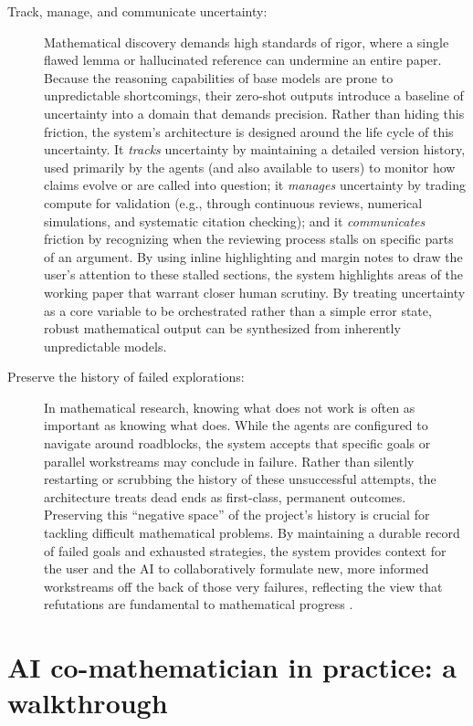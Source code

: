 \documentclass[11pt, a4paper, copyright, gdm]{google}
\begin{document}
\begin{description}
\item[Track, manage, and communicate uncertainty:] Mathematical discovery demands high standards of rigor, where a single flawed lemma or hallucinated reference can undermine an entire paper.
Because the reasoning capabilities of base models are prone to unpredictable shortcomings, their zero-shot outputs introduce a baseline of uncertainty into a domain that demands precision.
Rather than hiding this friction, the system's architecture is designed around the life cycle of this uncertainty.
It \emph{tracks} uncertainty by maintaining a detailed version history, used primarily by the agents (and also available to users) to monitor how claims evolve or are called into question; it \emph{manages} uncertainty by trading compute for validation (e.g., through continuous reviews, numerical simulations, and systematic citation checking); and it \emph{communicates} friction by recognizing when the reviewing process stalls on specific parts of an argument.
By using inline highlighting and margin notes to draw the user's attention to these stalled sections, the system highlights areas of the working paper that warrant closer human scrutiny.
By treating uncertainty as a core variable to be orchestrated rather than a simple error state, robust mathematical output can be synthesized from inherently unpredictable models.


\item[Preserve the history of failed explorations:] In mathematical research, knowing what does not work is often as important as knowing what does.
While the agents are configured to navigate around roadblocks, the system accepts that specific goals or parallel workstreams may conclude in failure.
Rather than silently restarting or scrubbing the history of these unsuccessful attempts, the architecture treats dead ends as first-class, permanent outcomes.
Preserving this ``negative space'' of the project's history is crucial for tackling difficult mathematical problems.
By maintaining a durable record of failed goals and exhausted strategies, the system provides context for the user and the AI to collaboratively formulate new, more informed workstreams off the back of those very failures, reflecting the view that refutations are fundamental to mathematical progress \citep{lakatos1976}.

\end{description}

%

\section{AI co-mathematician in practice: a walkthrough}
\end{document}
